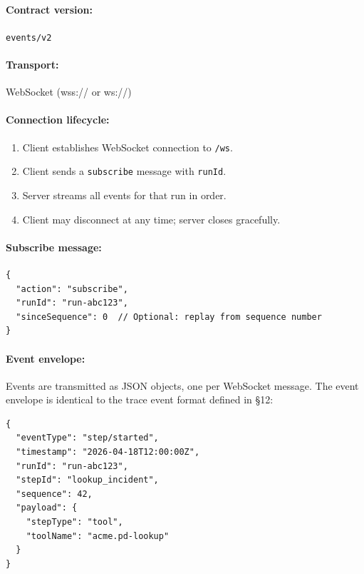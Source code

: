 \paragraph{Contract version:} \texttt{events/v2}

\paragraph{Transport:} WebSocket (wss:// or ws://)

\paragraph{Connection lifecycle:}

\begin{enumerate}
  \item Client establishes WebSocket connection to \texttt{/ws}.
  \item Client sends a \texttt{subscribe} message with \texttt{runId}.
  \item Server streams all events for that run in order.
  \item Client may disconnect at any time; server closes gracefully.
\end{enumerate}

\paragraph{Subscribe message:}

\begin{verbatim}
{
  "action": "subscribe",
  "runId": "run-abc123",
  "sinceSequence": 0  // Optional: replay from sequence number
}
\end{verbatim}

\paragraph{Event envelope:}

Events are transmitted as JSON objects, one per WebSocket message.  The event
envelope is identical to the trace event format defined in §12:

\begin{verbatim}
{
  "eventType": "step/started",
  "timestamp": "2026-04-18T12:00:00Z",
  "runId": "run-abc123",
  "stepId": "lookup_incident",
  "sequence": 42,
  "payload": {
    "stepType": "tool",
    "toolName": "acme.pd-lookup"
  }
}
\end{verbatim}


